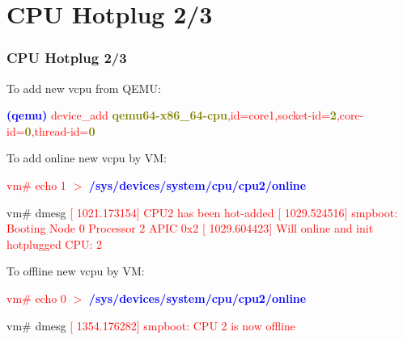 \documentclass[aspectratio=169]{beamer}
\begin{document}
\section{CPU Hotplug 2/3}
\begin{frame}
\frametitle{CPU Hotplug 2/3}
\begin{block}{}
\small

To add new vcpu from QEMU:

\textcolor{red}{\textbf{\textcolor{blue}{(qemu)}} device\_add \textbf{\textcolor{olive}{qemu64-x86\_64-cpu}},id=core1,socket-id=\textbf{\textcolor{olive}{2}},core-id=\textbf{\textcolor{olive}{0}},thread-id=\textbf{\textcolor{olive}{0}}} \newline

To add online new vcpu by VM:

\textcolor{red}{vm\# echo 1 $>$ \textbf{\textcolor{blue}{/sys/devices/system/cpu/cpu2/online}}} \newline

vm\# dmesg \newline 
\textcolor{red}{[ 1021.173154] CPU2 has been hot-added} \newline
\textcolor{red}{[ 1029.524516] smpboot: Booting Node 0 Processor 2 APIC 0x2} \newline
\textcolor{red}{[ 1029.604423] Will online and init hotplugged CPU: 2} \newline

To offline new vcpu by VM:

\textcolor{red}{vm\# echo 0 $>$ \textbf{\textcolor{blue}{/sys/devices/system/cpu/cpu2/online}}} \newline

vm\# dmesg \newline
\textcolor{red}{[ 1354.176282] smpboot: CPU 2 is now offline}

\end{block}
\end{frame}

\end{document}
